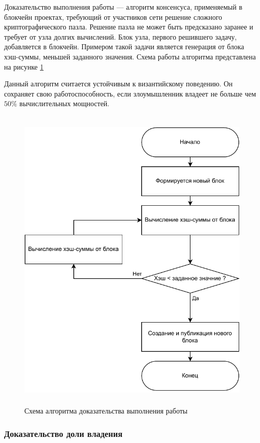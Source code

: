                 Доказательство выполнения работы\cite{gervais2016security} --- алгоритм консенсуса, применяемый в блокчейн проектах, требующий от участников сети решение сложного криптографического пазла. Решение пазла не может быть предсказано заранее и требует от узла долгих вычислений. Блок узла, первого решившего задачу, добавляется в блокчейн. Примером такой задачи является генерация от блока хэш-суммы, меньшей заданного значения. Схема работы алгоритма представлена на рисунке \ref{fig:pow}
                
                Данный алгоритм считается устойчивым к византийскому поведению. Он сохраняет свою работоспособность, если злоумышленник владеет не больше чем \( 50\% \) вычислительных мощностей.
                
                \begin{figure}
                    \centering
                    \includegraphics[width=\textwidth/2,height=15cm,keepaspectratio]{inc/img/pow.pdf}
                    \caption{Схема алгоритма доказательства выполнения работы} \label{fig:pow}
                \end{figure}

            \subsubsection{Доказательство доли владения}


